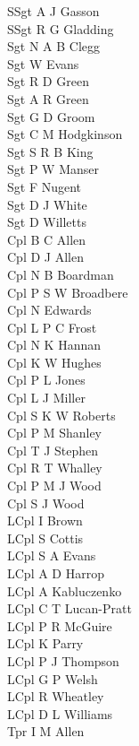 \begin{multicols}{4}
  \scriptsize
  \noindent
  SSgt A J Gasson \\
  SSgt R G Gladding \\
  Sgt N A B Clegg \\
  Sgt W Evans \\
  Sgt R D Green \\
  Sgt A R Green \\
  Sgt G D Groom \\
  Sgt C M Hodgkinson \\
  Sgt S R B King \\
  Sgt P W Manser \\
  Sgt F Nugent \\
  Sgt D J White \\
  Sgt D Willetts \\
  Cpl B C Allen \\
  Cpl D J Allen \\
  Cpl N B Boardman \\
  Cpl P S W Broadbere \\
  Cpl N Edwards \\
  Cpl L P C Frost \\
  Cpl N K Hannan \\
  Cpl K W Hughes \\
  Cpl P L Jones \\
  Cpl L J Miller \\
  Cpl S K W Roberts \\
  Cpl P M Shanley \\
  Cpl T J Stephen \\
  Cpl R T Whalley \\
  Cpl P M J Wood \\
  Cpl S J Wood \\
  LCpl I Brown \\
  LCpl S Cottis \\
  LCpl S A Evans \\
  LCpl A D Harrop \\
  LCpl A Kabluczenko \\
  LCpl C T Lucan-Pratt \\
  LCpl P R McGuire \\
  LCpl K Parry \\
  LCpl P J Thompson \\
  LCpl G P Welsh \\
  LCpl R Wheatley \\
  LCpl D L Williams \\
  Tpr I M Allen \\

\end{multicols}

